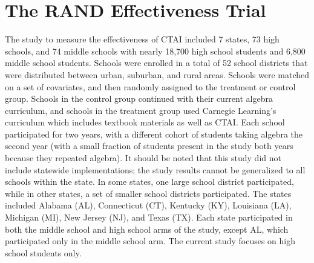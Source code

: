 \documentclass[12pt]{article}\usepackage[]{graphicx}\usepackage[]{color}
\begin{document}
\section{The RAND Effectiveness Trial}\label{sec:RANDtrial}
The study to measure the effectiveness of CTAI included 7 states, 73
high schools, and 74 middle schools with nearly 18,700 high school
students and 6,800 middle school students. Schools were enrolled in a
total of 52 school districts that were distributed between urban,
suburban, and rural areas. Schools were matched on a set of
covariates, and then randomly assigned to the treatment or control
group. Schools in the control group continued with their current
algebra curriculum, and schools in the treatment group used Carnegie
Learning's curriculum which includes textbook materials as well as
CTAI. Each school participated for two years, with a different cohort
of students taking algebra the second year (with a small fraction of
students present in the study both years because they repeated
algebra). It should be noted that this study did not include statewide
implementations; the study results cannot be generalized to all
schools within the state. In some states, one large school district
participated, while in other states, a set of smaller school districts
participated. The states included Alabama (AL), Connecticut (CT),
Kentucky (KY), Louisiana (LA), Michigan (MI), New Jersey (NJ), and
Texas (TX). Each state participated in both the middle school and high
school arms of the study, except AL, which participated only in the
middle school arm. The current study focuses on high school students
only. %
\end{document}
